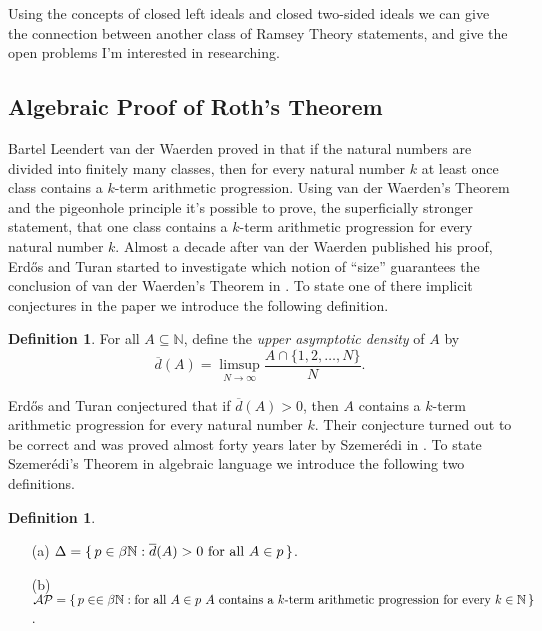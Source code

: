 \documentclass[12pt]{article}
\theoremstyle{plain}
\theoremstyle{definition}
\newtheorem{defn}[thm]{Definition}
\newcommand{\bbN}{\mathbb{N}}
\begin{document}
Using the concepts of closed left ideals and closed two-sided ideals
we can give the connection between another class of Ramsey Theory
statements, and give the open problems I'm interested in researching.

\subsection{Algebraic Proof of Roth's Theorem}
Bartel Leendert van der Waerden proved in
\cite{Van-der-Waerden:1927fk} that if the natural numbers are divided
into finitely many classes, then for every natural number $k$ at least
once class contains a $k$-term arithmetic progression. 
Using van der Waerden's Theorem and the pigeonhole principle it's
possible to prove, the superficially stronger statement, that one
class contains a $k$-term arithmetic progression for every natural
number $k$. 
Almost a decade after van der Waerden published his proof, Erd\H{o}s
and Turan started to investigate which notion of ``size'' guarantees
the conclusion of van der Waerden's Theorem in \cite{Erdos:1936fk}.
To state one of there implicit conjectures in the paper we introduce
the following definition.

  \begin{defn}
    For all $A \subseteq \bbN$, define the \textsl{upper asymptotic
      density} of $A$ by 
      \[
        \overline{d}(A) = \limsup_{N\to\infty} \frac{A \cap \{1, 2,
          \ldots, N\}}{N}.
      \]
  \end{defn}

Erd\H{o}s and Turan conjectured that if $\overline{d}(A) > 0$, then
$A$ contains a $k$-term arithmetic progression for every natural
number $k$.
Their conjecture turned out to be correct and was proved almost forty
years later by Szemer\'{e}di in \cite{Szemeredi:1975uq}. 
To state Szemer\'{e}di's Theorem in algebraic language we introduce
the following two definitions.
  \begin{defn}
    \begin{itemize}
      \item[(a)] $\Delta = \{\, p \in \beta\bbN : \overline{d}(A) > 0
        \hbox{ for all } A \in p \,\}$.
      \item[(b)] $\mathcal{AP} = \{\, p \in \in \beta\bbN : \hbox{for
          all $A \in p$ } A \hbox{ contains a $k$-term arithmetic
          progression for every $k \in \bbN$} \,\}$.
    \end{itemize}
  \end{defn}
\end{document}
